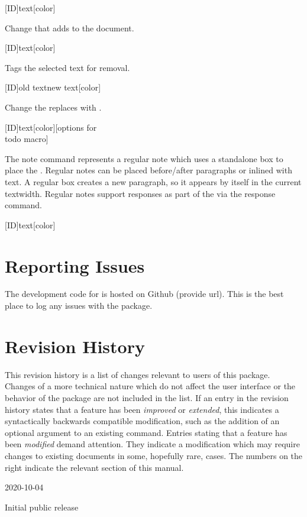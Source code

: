 \documentclass{ltxdockit}[2010/09/26]
\newcommand*\review{\sty{review}}
\begin{document}
\begin{ltxsyntax}

[ID]{text}[color]

Change that adds  to the document.

[ID]{text}[color]

Tags the selected text for removal.

[ID]{old text}{new text}[color]

Change the replaces  with .

[ID]{text}[color][options for \\todo macro]

The note command represents a regular note which uses a standalone box to place
the . Regular notes can be placed before/after paragraphs or inlined
with text. A regular box creates a new paragraph, so it appears by itself in
the current textwidth. Regular notes support responses as part of the
 via the response command.

[ID]{text}[color]

\end{ltxsyntax}


\section{Reporting Issues}

The development code for \review is hosted on Github (provide url). This is the best place to log any
issues with the package.


\section{Revision History}

This revision history is a list of changes relevant to users of this package.
Changes of a more technical nature which do not affect the user interface or
the behavior of the package are not included in the list. If an entry in the
revision history states that a feature has been \emph{improved} or
\emph{extended}, this indicates a syntactically backwards compatible
modification, such as the addition of an optional argument to an existing
command. Entries stating that a feature has been \emph{modified} demand
attention. They indicate a modification which may require changes to existing
documents in some, hopefully rare, cases. The numbers on the right indicate the
relevant section of this manual.

\begin{changelog}

\begin{release}{1.0}{2020-10-04}
\item Initial public release
\end{release}

\end{changelog}
\end{document}
